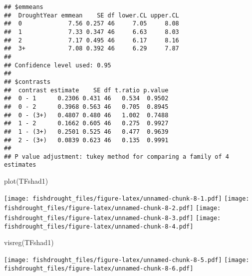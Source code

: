 \documentclass[
]{article}
\newenvironment{Shaded}{\begin{snugshade}}{\end{snugshade}}
\newcommand{\FunctionTok}[1]{\textcolor[rgb]{0.00,0.00,0.00}{#1}}
\newcommand{\NormalTok}[1]{#1}
\begin{document}
\begin{verbatim}
## $emmeans
##  DroughtYear emmean    SE df lower.CL upper.CL
##  0             7.56 0.257 46     7.05     8.08
##  1             7.33 0.347 46     6.63     8.03
##  2             7.17 0.495 46     6.17     8.16
##  3+            7.08 0.392 46     6.29     7.87
## 
## Confidence level used: 0.95 
## 
## $contrasts
##  contrast estimate    SE df t.ratio p.value
##  0 - 1      0.2306 0.431 46   0.534  0.9502
##  0 - 2      0.3968 0.563 46   0.705  0.8945
##  0 - (3+)   0.4807 0.480 46   1.002  0.7488
##  1 - 2      0.1662 0.605 46   0.275  0.9927
##  1 - (3+)   0.2501 0.525 46   0.477  0.9639
##  2 - (3+)   0.0839 0.623 46   0.135  0.9991
## 
## P value adjustment: tukey method for comparing a family of 4 estimates
\end{verbatim}

\begin{Shaded}
\begin{Highlighting}[]
\FunctionTok{plot}\NormalTok{(TFshad1)}
\end{Highlighting}
\end{Shaded}

\texttt{[image: fishdrought\_files/figure-latex/unnamed-chunk-8-1.pdf]}
\texttt{[image: fishdrought\_files/figure-latex/unnamed-chunk-8-2.pdf]}
\texttt{[image: fishdrought\_files/figure-latex/unnamed-chunk-8-3.pdf]}
\texttt{[image: fishdrought\_files/figure-latex/unnamed-chunk-8-4.pdf]}

\begin{Shaded}
\begin{Highlighting}[]
\FunctionTok{visreg}\NormalTok{(TFshad1)}
\end{Highlighting}
\end{Shaded}

\texttt{[image: fishdrought\_files/figure-latex/unnamed-chunk-8-5.pdf]}
\texttt{[image: fishdrought\_files/figure-latex/unnamed-chunk-8-6.pdf]}
\end{document}
